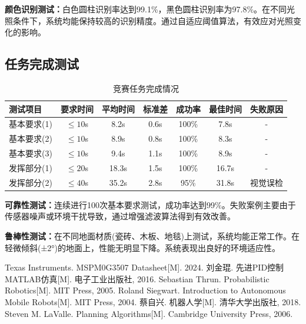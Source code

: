 \documentclass[UTF8]{ctexart}
\begin{document}
	\textbf{颜色识别测试：}白色圆柱识别率达到99.1\%，黑色圆柱识别率为97.8\%。在不同光照条件下，系统均能保持较高的识别精度。通过自适应阈值算法，有效应对光照变化的影响。
	
	\subsection{任务完成测试}
	
	\begin{table}[H]
		\centering
		\caption{竞赛任务完成情况}
		\begin{tabular}{lcccccc}
			\toprule
			测试项目 & 要求时间 & 平均时间 & 标准差 & 成功率 & 最佳时间 & 失败原因 \\
			\midrule
			基本要求(1) & $\leq 10$s & 8.2s & 0.6s & 100\% & 7.8s & - \\
			基本要求(2) & $\leq 10$s & 8.9s & 0.8s & 100\% & 8.3s & - \\
			基本要求(3) & $\leq 10$s & 9.4s & 1.1s & 100\% & 8.9s & - \\
			发挥部分(1) & $\leq 20$s & 18.3s & 1.5s & 100\% & 16.7s & - \\
			发挥部分(2) & $\leq 40$s & 35.2s & 2.8s & 95\% & 31.8s & 视觉误检 \\
			\bottomrule
		\end{tabular}
	\end{table}
	
	\textbf{可靠性测试：}连续进行100次基本要求测试，成功率达到99\%。失败案例主要由于传感器噪声或环境干扰导致，通过增强滤波算法得到有效改善。
	
	\textbf{鲁棒性测试：}在不同地面材质(瓷砖、木板、地毯)上测试，系统均能正常工作。在轻微倾斜(±2°)的地面上，性能无明显下降。系统表现出良好的环境适应性。
	
	\begin{thebibliography}{99}
		 Texas Instruments. MSPM0G3507 Datasheet[M]. 2024.
		 刘金琨. 先进PID控制MATLAB仿真[M]. 电子工业出版社, 2016.
		 Sebastian Thrun. Probabilistic Robotics[M]. MIT Press, 2005.
		 Roland Siegwart. Introduction to Autonomous Mobile Robots[M]. MIT Press, 2004.
		 蔡自兴. 机器人学[M]. 清华大学出版社, 2018.
		 Steven M. LaValle. Planning Algorithms[M]. Cambridge University Press, 2006.
	\end{thebibliography}
	
\end{document}
